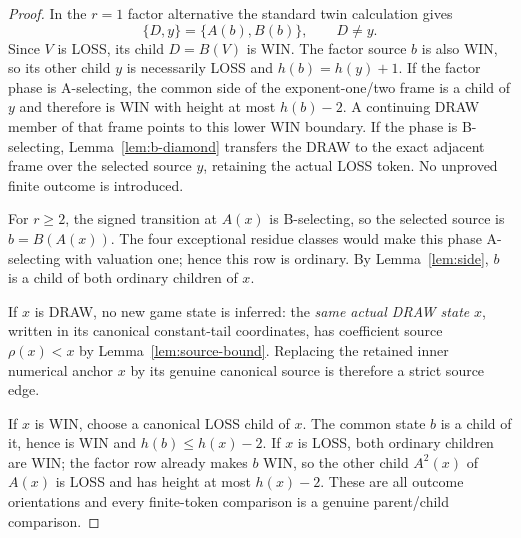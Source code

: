 \begin{proof}
In the $r=1$ factor alternative the standard twin calculation gives
\[
 \{D,y\}=\{A(b),B(b)\},\qquad D\ne y.
\]
Since $V$ is LOSS, its
child $D=B(V)$ is WIN.  The factor source $b$ is also WIN, so its other child
$y$ is necessarily LOSS and $h(b)=h(y)+1$.  If the factor phase is
A-selecting, the common side of the exponent-one/two frame is a child of $y$
and therefore is WIN with height at most $h(b)-2$.  A continuing DRAW member
of that frame points to this lower WIN boundary.  If the phase is B-selecting,
Lemma~\ref{lem:b-diamond} transfers the DRAW to the exact adjacent frame over
the selected source $y$, retaining the actual LOSS token.  No unproved
finite outcome is introduced.

For $r\ge2$, the signed transition at $A(x)$ is B-selecting, so the selected
source is $b=B(A(x))$.  The four exceptional residue classes would make this
phase A-selecting with valuation one; hence this row is ordinary.  By
Lemma~\ref{lem:side}, $b$ is a child of both ordinary children of $x$.

If $x$ is DRAW, no new game state is inferred: the \emph{same actual DRAW
state} $x$, written in its canonical constant-tail coordinates, has coefficient
source $\rho(x)<x$ by Lemma~\ref{lem:source-bound}.  Replacing the retained
inner numerical anchor $x$ by its genuine canonical source is therefore a
strict source edge.

If $x$ is WIN, choose a canonical LOSS child of $x$.  The common state $b$ is
a child of it, hence is WIN and $h(b)\le h(x)-2$.  If $x$ is LOSS, both
ordinary children are WIN; the factor row already makes $b$ WIN, so the other
child $A^2(x)$ of $A(x)$ is LOSS and has height at most $h(x)-2$.  These are
all outcome orientations and every finite-token comparison is a genuine
parent/child comparison.
\end{proof}

